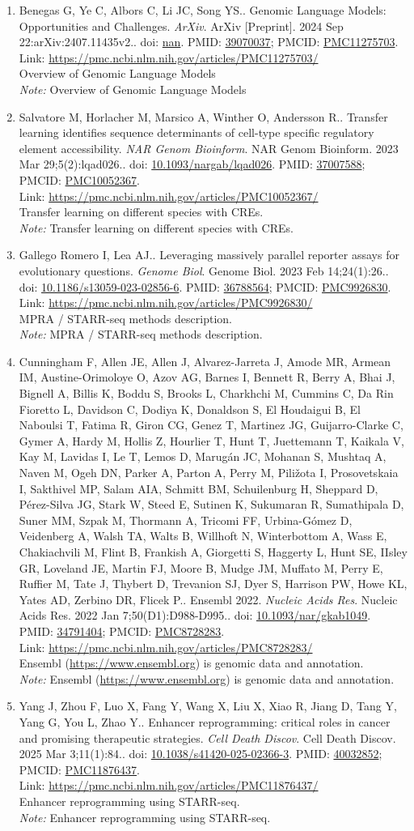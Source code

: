 \documentclass[12pt]{article}
\newcommand{\Pub}[9]{%
  \item #1. #2. \textit{#3}. #4. doi: \href{https://doi.org/#5}{#5}. PMID: \href{https://pubmed.ncbi.nlm.nih.gov/#6/}{#6}; PMCID: \href{https://www.ncbi.nlm.nih.gov/pmc/articles/#7/}{#7}. \\
  \noindent Link: \url{#8}\\
  \ifx#9\relax\else\\\textit{Note:} #9\fi
}
\begin{document}
\begin{enumerate}[leftmargin=*,label=\textbf{\arabic*.}]
\Pub{Benegas G, Ye C, Albors C, Li JC, Song YS.}{Genomic Language Models: Opportunities and Challenges}{ArXiv}{ArXiv [Preprint]. 2024 Sep 22:arXiv:2407.11435v2.}{nan}{39070037}{PMC11275703}{https://pmc.ncbi.nlm.nih.gov/articles/PMC11275703/}{Overview of Genomic Language Models}

\Pub{Salvatore M, Horlacher M, Marsico A, Winther O, Andersson R.}{Transfer learning identifies sequence determinants of cell-type specific regulatory element accessibility}{NAR Genom Bioinform}{NAR Genom Bioinform. 2023 Mar 29;5(2):lqad026.}{10.1093/nargab/lqad026}{37007588}{PMC10052367}{https://pmc.ncbi.nlm.nih.gov/articles/PMC10052367/}{Transfer learning on different species with CREs.}

\Pub{Gallego Romero I, Lea AJ.}{Leveraging massively parallel reporter assays for evolutionary questions}{Genome Biol}{Genome Biol. 2023 Feb 14;24(1):26.}{10.1186/s13059-023-02856-6}{36788564}{PMC9926830}{https://pmc.ncbi.nlm.nih.gov/articles/PMC9926830/}{MPRA / STARR-seq methods description.}

\Pub{Cunningham F, Allen JE, Allen J, Alvarez-Jarreta J, Amode MR, Armean IM, Austine-Orimoloye O, Azov AG, Barnes I, Bennett R, Berry A, Bhai J, Bignell A, Billis K, Boddu S, Brooks L, Charkhchi M, Cummins C, Da Rin Fioretto L, Davidson C, Dodiya K, Donaldson S, El Houdaigui B, El Naboulsi T, Fatima R, Giron CG, Genez T, Martinez JG, Guijarro-Clarke C, Gymer A, Hardy M, Hollis Z, Hourlier T, Hunt T, Juettemann T, Kaikala V, Kay M, Lavidas I, Le T, Lemos D, Marugán JC, Mohanan S, Mushtaq A, Naven M, Ogeh DN, Parker A, Parton A, Perry M, Piližota I, Prosovetskaia I, Sakthivel MP, Salam AIA, Schmitt BM, Schuilenburg H, Sheppard D, Pérez-Silva JG, Stark W, Steed E, Sutinen K, Sukumaran R, Sumathipala D, Suner MM, Szpak M, Thormann A, Tricomi FF, Urbina-Gómez D, Veidenberg A, Walsh TA, Walts B, Willhoft N, Winterbottom A, Wass E, Chakiachvili M, Flint B, Frankish A, Giorgetti S, Haggerty L, Hunt SE, IIsley GR, Loveland JE, Martin FJ, Moore B, Mudge JM, Muffato M, Perry E, Ruffier M, Tate J, Thybert D, Trevanion SJ, Dyer S, Harrison PW, Howe KL, Yates AD, Zerbino DR, Flicek P.}{Ensembl 2022}{Nucleic Acids Res}{Nucleic Acids Res. 2022 Jan 7;50(D1):D988-D995.}{10.1093/nar/gkab1049}{34791404}{PMC8728283}{https://pmc.ncbi.nlm.nih.gov/articles/PMC8728283/}{Ensembl (\url{https://www.ensembl.org}) is genomic data and annotation.}

\newpage

\Pub{Yang J, Zhou F, Luo X, Fang Y, Wang X, Liu X, Xiao R, Jiang D, Tang Y, Yang G, You L, Zhao Y.}{Enhancer reprogramming: critical roles in cancer and promising therapeutic strategies}{Cell Death Discov}{Cell Death Discov. 2025 Mar 3;11(1):84.}{10.1038/s41420-025-02366-3}{40032852}{PMC11876437}{https://pmc.ncbi.nlm.nih.gov/articles/PMC11876437/}{Enhancer reprogramming using STARR-seq.}


\end{enumerate}
\end{document}
